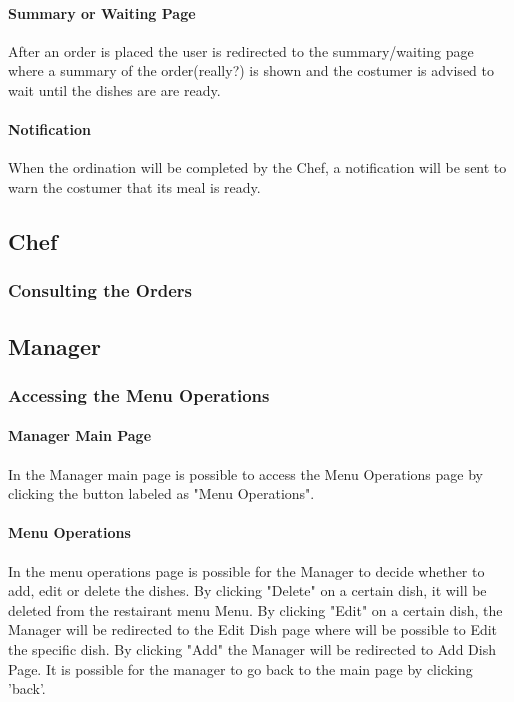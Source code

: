\paragraph{Summary or Waiting Page}
After an order is placed the user is redirected to the summary/waiting page where a summary of the order(really?) is shown and the costumer is advised to wait until the dishes are are ready.

\paragraph{Notification}
When the ordination will be completed by the Chef, a notification will be sent to warn the costumer that its meal is ready.

\subsection{Chef}
\subsubsection{Consulting the Orders}

\subsection{Manager}
\subsubsection{Accessing the Menu Operations}
\paragraph{Manager Main Page}
In the Manager main page is possible to access the Menu Operations page by clicking the button labeled as "Menu Operations".

\paragraph{Menu Operations}
In the menu operations page is possible for the Manager to decide whether to add, edit or delete the dishes.
By clicking "Delete" on a certain dish, it will be deleted from the restairant menu Menu.
By clicking "Edit" on a certain dish, the Manager will be redirected to the Edit Dish page where will be possible to Edit the specific dish.
By clicking "Add" the Manager will be redirected to Add Dish Page.
It is possible for the manager to go back to the main page by clicking 'back'.

